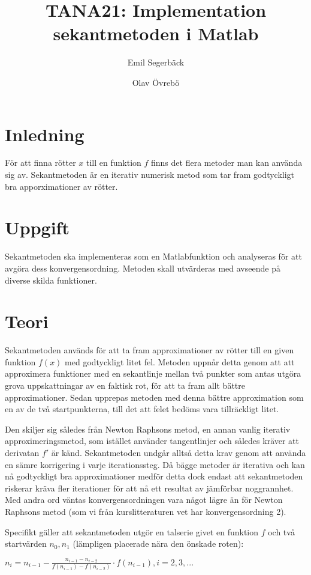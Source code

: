 \documentclass{article}
\title{TANA21: Implementation sekantmetoden i Matlab}
\author{Emil Segerbäck \and Olav Övrebö}
\begin{document}
\maketitle
\newpage

\section{Inledning}
För att finna rötter $x$ till en funktion $f$ finns det flera metoder man kan använda sig av. Sekantmetoden är en iterativ numerisk metod som tar fram godtyckligt bra apporximationer av rötter.

\section{Uppgift}
Sekantmetoden ska implementeras som en Matlabfunktion och analyseras för att avgöra dess konvergensordning. Metoden skall utvärderas med avseende på diverse skilda funktioner.

\section{Teori}
Sekantmetoden används för att ta fram approximationer av rötter till en given funktion $f(x)$ med godtyckligt litet fel. Metoden uppnår detta genom att att approximera funktioner med en sekantlinje mellan två punkter som antas utgöra grova uppskattningar av en faktisk rot, för att ta fram allt bättre approximationer. Sedan upprepas metoden med denna bättre approximation som en av de två startpunkterna, till det att felet bedöms vara tillräckligt litet.

Den skiljer sig således från Newton Raphsons metod, en annan vanlig iterativ approximeringsmetod, som istället använder tangentlinjer och således kräver att derivatan $f'$ är känd. Sekantmetoden undgår alltså detta krav genom att använda en sämre korrigering i varje iterationssteg. Då bägge metoder är iterativa och kan nå godtyckligt bra approximationer medför detta dock endast att sekantmetoden riskerar kräva fler iterationer för att nå ett resultat av jämförbar noggrannhet. Med andra ord väntas konvergensordningen vara något lägre än för Newton Raphsons metod (som vi från kurslitteraturen vet har konvergensordning 2).

Specifikt gäller att sekantmetoden utgör en talserie givet en funktion $f$ och två startvärden $n_{0}, n_{1}$ (lämpligen placerade nära den önskade roten): 

$ n_{i} = n_{i-1} - \frac{n_{i-1} - n_{i-2}}{f(n_{i-1}) - f(n_{i-2})} \cdot f(n_{i-1}), i = 2, 3, ...$
\end{document}
